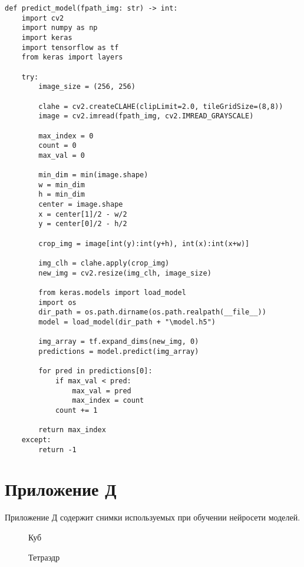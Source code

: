 \begin{lstlisting}[caption = Реализация алгоритма определения трёхмерного объекта\, наиболее вероятно являющимся объектом изображённым на снимке, label = lst:predict]
def predict_model(fpath_img: str) -> int:
    import cv2
    import numpy as np
    import keras
    import tensorflow as tf
    from keras import layers
    
    try:
        image_size = (256, 256)

        clahe = cv2.createCLAHE(clipLimit=2.0, tileGridSize=(8,8))
        image = cv2.imread(fpath_img, cv2.IMREAD_GRAYSCALE)
        
        max_index = 0
        count = 0
        max_val = 0

        min_dim = min(image.shape)
        w = min_dim
        h = min_dim
        center = image.shape
        x = center[1]/2 - w/2
        y = center[0]/2 - h/2

        crop_img = image[int(y):int(y+h), int(x):int(x+w)]

        img_clh = clahe.apply(crop_img)
        new_img = cv2.resize(img_clh, image_size)

        from keras.models import load_model
        import os
        dir_path = os.path.dirname(os.path.realpath(__file__))
        model = load_model(dir_path + "\model.h5")
        
        img_array = tf.expand_dims(new_img, 0)
        predictions = model.predict(img_array)
        
        for pred in predictions[0]:
            if max_val < pred:
                max_val = pred
                max_index = count
            count += 1
            
        return max_index
    except:
        return -1
\end{lstlisting}

\chapter*{Приложение Д}
\renewcommand\thefigure{Д.\arabic{figure}}  
\setcounter{figure}{0}
Приложение Д содержит снимки используемых при обучении нейросети моделей.

\begin{figure}[H]
	\caption{Куб}
	\label{fig:cube}
\end{figure}

\begin{figure}[H]
	\caption{Тетраэдр}
	\label{fig:tetr}
\end{figure}

